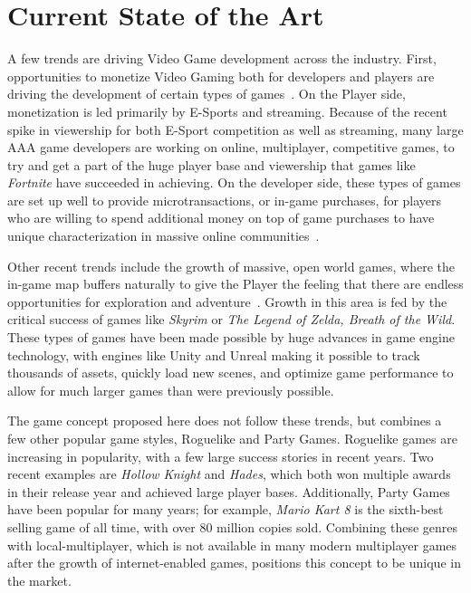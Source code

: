 \section{Current State of the Art}

A few trends are driving Video Game development across the industry. First, opportunities to monetize Video Gaming both for developers and
players are driving the development of certain types of games~\cite{b5}. On the Player side, monetization is led primarily by E-Sports and streaming. Because
of the recent spike in viewership for both E-Sport competition as well as streaming, many large AAA game developers are working on online,
multiplayer, competitive games, to try and get a part of the huge player base and viewership that games like \textit{Fortnite} have succeeded in
achieving. On the developer side, these types of games are set up well to provide microtransactions, or in-game purchases, for players who
are willing to spend additional money on top of game purchases to have unique characterization in massive online communities~\cite{b6}.

Other recent trends include the growth of massive, open world games, where the in-game map buffers naturally to give the Player the feeling that
there are endless opportunities for exploration and adventure~\cite{b7}. Growth in this area is fed by the critical success of games like \textit{Skyrim} or \textit{The
Legend of Zelda, Breath of the Wild}. These types of games have been made possible by huge advances in game engine technology, with engines like
Unity and Unreal making it possible to track thousands of assets, quickly load new scenes, and optimize game performance to allow for much
larger games than were previously possible.

The game concept proposed here does not follow these trends, but combines a few other popular game styles, Roguelike and Party Games. Roguelike
games are increasing in popularity, with a few large success stories in recent years. Two recent examples are \textit{Hollow Knight} and
\textit{Hades}, which both won multiple awards in their release year and achieved large player bases. Additionally, Party Games have been popular
for many years; for example, \textit{Mario Kart 8} is the sixth-best selling game of all time, with over 80 million copies sold. Combining these
genres with local-multiplayer, which is not available in many modern multiplayer games after the growth of internet-enabled games, positions this
concept to be unique in the market.
